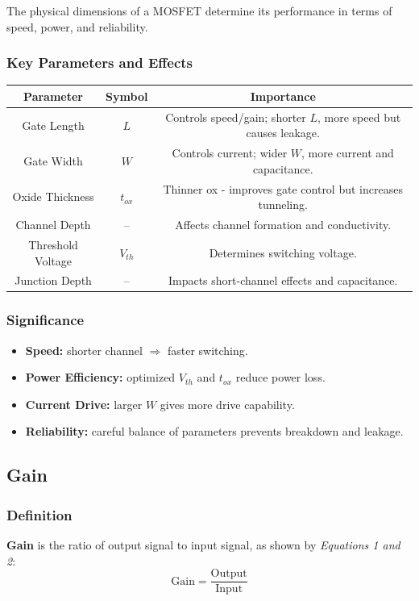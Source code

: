\documentclass[a4paper,12pt]{article}
\begin{document}
The physical dimensions of a MOSFET determine its performance in terms of speed, power, and reliability.

\subsubsection{Key Parameters and Effects}
\begin{center}
\begin{tabular}{|c|c|c|}
\hline
\textbf{Parameter} & \textbf{Symbol} & \textbf{Importance} \\
\hline
Gate Length & $L$ & Controls speed/gain; shorter $L$, more speed but causes leakage. \\
Gate Width & $W$ & Controls current; wider $W$, more current and capacitance. \\
Oxide Thickness & $t_{ox}$ & Thinner ox - improves gate control but increases tunneling. \\
Channel Depth & -- & Affects channel formation and conductivity. \\
Threshold Voltage & $V_{th}$ & Determines switching voltage. \\
Junction Depth & -- & Impacts short-channel effects and capacitance. \\
\hline
\end{tabular}
\end{center}

\subsubsection{Significance}
\begin{itemize}
    \item \textbf{Speed:} shorter channel $\Rightarrow$ faster switching.
    \item \textbf{Power Efficiency:} optimized $V_{th}$ and $t_{ox}$ reduce power loss.
    \item \textbf{Current Drive:} larger $W$ gives more drive capability.
    \item \textbf{Reliability:} careful balance of parameters prevents breakdown and leakage.
\end{itemize}

\subsection{Gain}

\subsubsection{Definition}
\textbf{Gain} is the ratio of output signal to input signal, as shown by \textit{Equations 1 and 2}:
\begin{equation}
    \text{Gain} = \frac{\text{Output}}{\text{Input}}
\end{equation}
\end{document}
